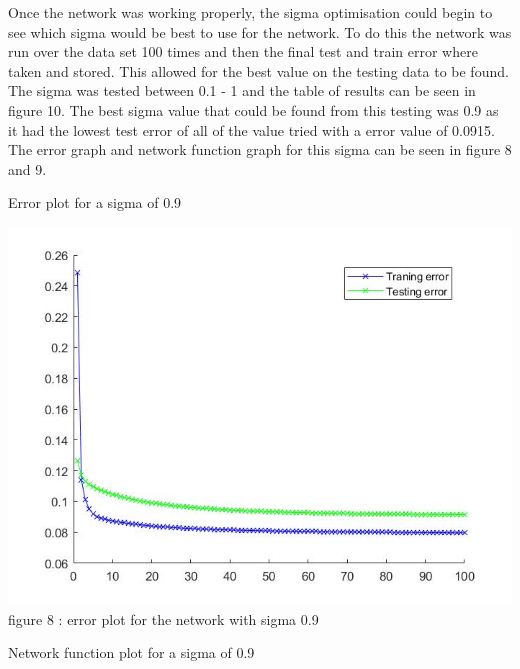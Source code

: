 \documentclass{IEEEtran}[11pt]
\begin{document}
\begin{flushleft}
  Once the network was working properly, the sigma optimisation could begin to see which sigma would be best to use for the
  network. To do this the network was run over the data set 100 times and then the final test and train error where taken and
  stored. This allowed for the best value on the testing data to be found. The sigma was tested between 0.1 - 1 and the table
  of results can be seen in figure 10. The best sigma value that could be found from this testing was 0.9 as it had the lowest
  test error of all of the value tried with a error value of 0.0915. The error graph and network function graph for this sigma
  can be seen in figure 8 and 9.
  \\
  \vspace{1.5mm}
  \begin{center}
    Error plot for a sigma of 0.9
  \end{center}
  \vspace{1.5mm}
  \includegraphics[scale = 0.35]{Errorplottask1.jpg}
  \vspace{1.5mm}
  {\footnotesize figure 8 : error plot for the network with sigma 0.9 }
  \\
  \vspace{1.5mm}
  \begin{center}
    Network function plot for a sigma of 0.9
  \end{center}

\end{flushleft}
\end{document}
